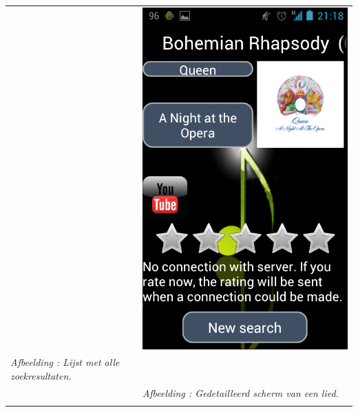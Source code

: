 \documentclass[11pt,a4paper]{article}
\newcounter{figc}
\newcommand{\increaseFigID} {%
   \stepcounter{figc}%
   \thefigc}
\newcommand{\figID}[1]{\small \textit{Afbeelding \increaseFigID : #1} \\ \normalsize}
\begin{document}
{\begin{tabular} {p{7cm} >{\centering\arraybackslash}p{7cm}@{\hskip 0.5in}}
		& \includegraphics[scale=0.28]{Pictures/Screenshot_2013-05-24-21-18-48.png} \\
		
		\centering \figID{Lijst met alle zoekresultaten.}  
		& \figID{Gedetailleerd scherm van een lied.} 
		\vspace{1pt} & \vspace{1pt} \\
		

\end{tabular}}
\end{document}
